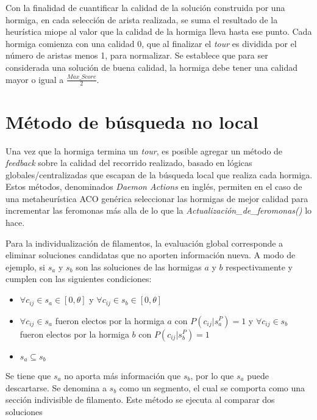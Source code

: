 Con la finalidad de cuantificar la calidad de la soluci\'on construida por una hormiga, en cada selecci\'on de arista realizada, se suma el resultado de la heur\'istica miope al valor que la calidad de la hormiga lleva hasta ese punto. Cada hormiga comienza con una calidad 0, que al finalizar el {\it tour} es dividida por el n\'umero de aristas menos 1, para normalizar. Se establece que para ser considerada una soluci\'on de buena calidad, la hormiga debe tener una calidad mayor o igual a $\frac{Max\_Score}{2}$.
    
\section{M\'etodo de b\'usqueda no local}
Una vez que la hormiga termina un {\it tour}, es posible agregar un m\'etodo de {\it feedback} sobre la calidad del recorrido realizado, basado en l\'ogicas globales/centralizadas que escapan de la b\'usqueda local que realiza cada hormiga. Estos m\'etodos, denominados {\it Daemon Actions} en ingl\'es, permiten en el caso de una metaheur\'istica ACO gen\'erica seleccionar las hormigas de mejor calidad para incrementar las feromonas m\'as alla de lo que la {\it Actualizaci\'on\_de\_feromonas()} lo hace. 

Para la individualizaci\'on de filamentos, la evaluaci\'on global corresponde a eliminar soluciones candidatas que no aporten informaci\'on nueva. A modo de ejemplo, si $s_a$ y $s_b$ son las soluciones de las hormigas $a$ y $b$ respectivamente y cumplen con las siguientes condiciones:

\begin{itemize}
    \item $\forall c_{ij} \in s_a \in [0, \theta]$ y $\forall c_{ij} \in s_b \in [0, \theta]$
    \item $\forall c_{ij} \in s_a$ fueron electos por la hormiga $a$ con $P(c_{ij} | s_{a}^{P}) = 1$ y $\forall c_{ij} \in s_b$ fueron electos por la hormiga $b$ con $P(c_{ij} | s_{b}^{P}) = 1$
    \item $s_a \subseteq s_b$
\end{itemize}

Se tiene que $s_a$ no aporta m\'as informaci\'on que $s_b$, por lo que $s_a$ puede descartarse. Se denomina a $s_b$ como un segmento, el cual se comporta como una secci\'on indivisible de filamento. Este m\'etodo se ejecuta al comparar dos soluciones 

    
